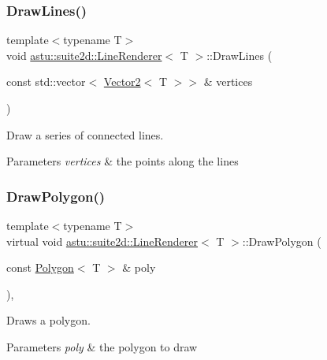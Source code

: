\subsubsection{\texorpdfstring{Draw\+Lines()}{DrawLines()}}
{\footnotesize\ttfamily template$<$typename T$>$ \\
void \hyperlink{classastu_1_1suite2d_1_1LineRenderer}{astu\+::suite2d\+::\+Line\+Renderer}$<$ T $>$\+::Draw\+Lines (\begin{DoxyParamCaption}\item[{const std\+::vector$<$ \hyperlink{classastu_1_1Vector2}{Vector2}$<$ T $>$$>$ \&}]{vertices }\end{DoxyParamCaption})\hspace{0.3cm}{\ttfamily [inline]}}

Draw a series of connected lines.


\begin{DoxyParams}{Parameters}
{\em vertices} & the points along the lines \\
\hline
\end{DoxyParams}
\mbox{\label{classastu_1_1suite2d_1_1LineRenderer_a3f05efe889a3d7705071139c142d54ad}} 
\subsubsection{\texorpdfstring{Draw\+Polygon()}{DrawPolygon()}}
{\footnotesize\ttfamily template$<$typename T$>$ \\
virtual void \hyperlink{classastu_1_1suite2d_1_1LineRenderer}{astu\+::suite2d\+::\+Line\+Renderer}$<$ T $>$\+::Draw\+Polygon (\begin{DoxyParamCaption}\item[{const \hyperlink{classastu_1_1Polygon}{Polygon}$<$ T $>$ \&}]{poly }\end{DoxyParamCaption})\hspace{0.3cm}{\ttfamily [inline]}, {\ttfamily [virtual]}}

Draws a polygon.


\begin{DoxyParams}{Parameters}
{\em poly} & the polygon to draw \\
\hline
\end{DoxyParams}
\mbox{\label{classastu_1_1suite2d_1_1LineRenderer_ac77778c3e9f3f405d0552e585511c361}} 
